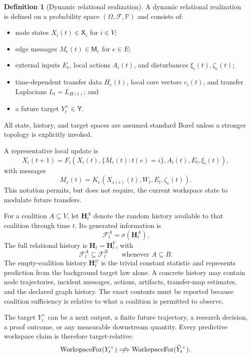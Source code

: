 \documentclass[11pt,letterpaper]{article}
\theoremstyle{plain}
\theoremstyle{definition}
\newtheorem{definition}[theorem]{Definition}
\begin{document}
\begin{definition}[Dynamic relational realization]\label{def:dynamic-realization}
A dynamic relational realization is defined on a probability space
\((\Omega,\mathcal F,\mathbb P)\) and consists of:
\begin{itemize}
\item node states \(X_i(t)\in\mathsf X_i\) for \(i\in V\);
\item edge messages \(M_e(t)\in\mathsf M_e\) for \(e\in E\);
\item external inputs \(E_t\), local actions \(A_i(t)\), and disturbances
 \(\xi_i(t),\zeta_e(t)\);
\item time-dependent transfer data \(H_e(t)\), local core vectors \(c_i(t)\),
 and transfer Laplacians \(L_t=L_{H(t)}\); and
\item a future target \(Y_t^+\in\mathsf Y\).
\end{itemize}
All state, history, and target spaces are assumed standard Borel unless a
stronger topology is explicitly invoked.
\end{definition}

A representative local update is
\[
X_i(t+1)
=
F_i\!\left(
X_i(t),
\{M_e(t):t(e)=i\},
A_i(t),E_t,\xi_i(t)
\right),
\]
with messages
\[
M_e(t)
=
K_e\!\left(
X_{s(e)}(t),
W_t,
E_t,\zeta_e(t)
\right).
\]
This notation permits, but does not require, the current workspace state to
modulate future transfers.

For a coalition \(A\subseteq V\), let \(\mathbf H_t^A\) denote the random
history available to that coalition through time \(t\). Its generated
information is
\[
\mathcal F_t^A=\sigma(\mathbf H_t^A).
\]
The full relational history is \(\mathbf H_t=\mathbf H_t^V\), with
\[
\mathcal F_t^A\subseteq\mathcal F_t^B
\qquad
\text{whenever }A\subseteq B.
\]
The empty-coalition history \(\mathbf H_t^\varnothing\) is the trivial
constant statistic and represents prediction from the background target law
alone.
A concrete history may contain node trajectories, incident messages, actions,
artifacts, transfer-map estimates, and the declared graph history. The exact
contents must be reported because coalition sufficiency is relative to what a
coalition is permitted to observe.

The target \(Y_t^+\) can be a next output, a finite future trajectory, a
research decision, a proof outcome, or any measurable downstream quantity.
Every predictive workspace claim is therefore target-relative:
\[
\operatorname{WorkspaceFor}(Y_t^+)
\centernot\Longrightarrow
\operatorname{WorkspaceFor}(\widetilde Y_t^+).
\]
\end{document}
